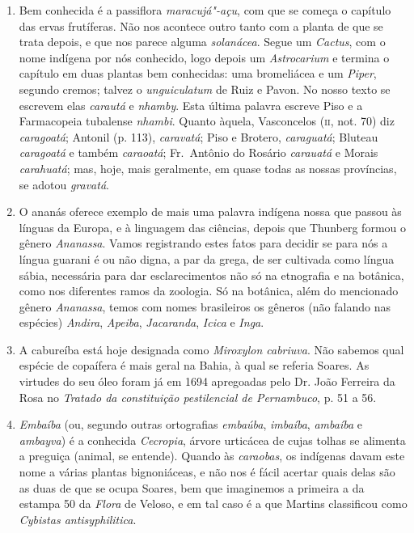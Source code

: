 \begin{enumerate}
\item  Bem conhecida é a passiflora \textit{maracujá"-açu}, com que se começa o
capítulo das ervas frutíferas. Não nos acontece outro tanto com a planta
de que se trata depois, e que nos parece alguma \textit{solanácea}. Segue um \textit{Cactus}, 
com o nome indígena por nós conhecido, logo depois um \textit{Astrocarium}
e termina o capítulo em duas plantas bem conhecidas: uma bromeliácea e
um \textit{Piper}, segundo cremos; talvez o \textit{unguiculatum} de Ruiz e Pavon. No nosso
texto se escrevem elas \textit{carautá} e \textit{nhamby}. Esta última palavra escreve Piso
e a Farmacopeia tubalense \textit{nhambi}. Quanto àquela, Vasconcelos (\textsc{ii}, not.
70) diz \textit{caragoatá}; Antonil (p. 113), \textit{caravatá}; Piso e Brotero, \textit{caraguatá};
Bluteau \textit{caragoatá} e também \textit{caraoatá}; Fr.~Antônio do Rosário \textit{carauatá} e
Morais \textit{carahuatá}; mas, hoje, mais geralmente, em quase todas as nossas
províncias, se adotou \textit{gravatá}.

\item O ananás oferece exemplo de mais uma palavra indígena nossa que passou às 
línguas da Europa, e à linguagem das ciências, depois que Thunberg formou o gênero  
\textit{Ananassa}. Vamos registrando estes fatos para decidir se para nós a língua guarani é ou 
não digna, a par da grega, de ser cultivada como língua sábia, necessária para dar 
esclarecimentos não só na etnografia e na botânica, como nos diferentes ramos da 
zoologia. Só na botânica, além do mencionado gênero \textit{Ananassa}, temos com nomes 
brasileiros os gêneros (não falando nas espécies) \textit{Andira}, \textit{Apeiba}, \textit{Jacaranda}, \textit{Icica} e \textit{Inga}.

\item A cabureíba está hoje designada como \textit{Miroxylon cabriuva}. Não sabemos qual 
espécie de copaífera é mais geral na Bahia, à qual se referia Soares. As virtudes do seu 
óleo foram já em 1694 apregoadas pelo Dr. João Ferreira da Rosa no \textit{Tratado da constituição pestilencial de Pernambuco}, p. 51 a 56.

\item \textit{Embaíba} (ou, segundo outras ortografias \textit{embaúba}, \textit{imbaíba}, \textit{ambaíba} e \textit{ambayva}) 
é a conhecida \textit{Cecropia}, árvore urticácea de cujas tolhas se alimenta a preguiça 
(animal, se entende). Quando às \textit{caraobas}, os indígenas davam este nome a várias 
plantas bignoniáceas, e não nos é fácil acertar quais delas são as duas de que se ocupa 
Soares, bem que imaginemos a primeira a da estampa 50 da \textit{Flora} de Veloso, e em tal 
caso é a que Martins classificou como \textit{Cybistas antisyphilitica}.


\end{enumerate}

